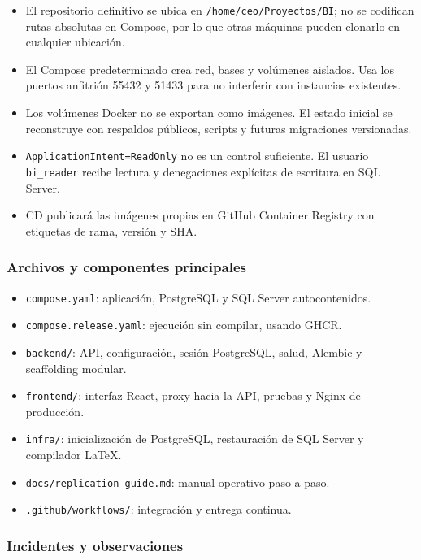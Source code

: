 \documentclass[11pt,letterpaper]{article}
\newcommand{\file}[1]{\texttt{#1}}
\begin{document}
\begin{itemize}
  \item El repositorio definitivo se ubica en \file{/home/ceo/Proyectos/BI}; no se codifican rutas absolutas en Compose, por lo que otras máquinas pueden clonarlo en cualquier ubicación.
  \item El Compose predeterminado crea red, bases y volúmenes aislados. Usa los puertos anfitrión 55432 y 51433 para no interferir con instancias existentes.
  \item Los volúmenes Docker no se exportan como imágenes. El estado inicial se reconstruye con respaldos públicos, scripts y futuras migraciones versionadas.
  \item \file{ApplicationIntent=ReadOnly} no es un control suficiente. El usuario \file{bi\_reader} recibe lectura y denegaciones explícitas de escritura en SQL Server.
  \item CD publicará las imágenes propias en GitHub Container Registry con etiquetas de rama, versión y SHA.
\end{itemize}

\subsubsection{Archivos y componentes principales}

\begin{itemize}
  \item \file{compose.yaml}: aplicación, PostgreSQL y SQL Server autocontenidos.
  \item \file{compose.release.yaml}: ejecución sin compilar, usando GHCR.
  \item \file{backend/}: API, configuración, sesión PostgreSQL, salud, Alembic y scaffolding modular.
  \item \file{frontend/}: interfaz React, proxy hacia la API, pruebas y Nginx de producción.
  \item \file{infra/}: inicialización de PostgreSQL, restauración de SQL Server y compilador LaTeX.
  \item \file{docs/replication-guide.md}: manual operativo paso a paso.
  \item \file{.github/workflows/}: integración y entrega continua.
\end{itemize}

\subsubsection{Incidentes y observaciones}
\end{document}
